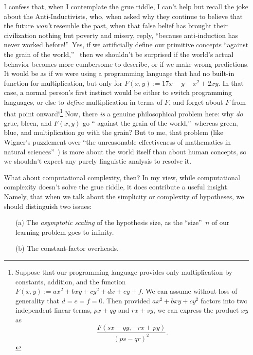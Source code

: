 \documentclass[12pt,onecolumn]{article}%
\begin{document}
I confess that, when I contemplate the grue riddle, I can't help but recall
the joke about the Anti-Inductivists, who, when asked why they continue to
believe that the future \textit{won't} resemble the past, when that false
belief has brought their civilization nothing but poverty and misery, reply,
\textquotedblleft because anti-induction has never worked
before!\textquotedblright\  Yes, if we artificially define our primitive
concepts \textquotedblleft against the grain of the world,\textquotedblright\ %
 then we shouldn't be surprised if the world's actual behavior becomes more
cumbersome to describe, or if we make wrong predictions. It would be as if
we were using a programming language that had no built-in function for
multiplication, but only for $F\left(  x,y\right)  :=17x-y-x^{2}+2xy$. In
that case, a normal person's first instinct would be either to switch
programming languages, or else to \textit{define} multiplication in terms of
$F$, and forget about $F$ from that point onward!\footnote{Suppose that our
programming language provides only multiplication by constants, addition, and
the function $F\left(  x,y\right)  :=ax^{2}+bxy+cy^{2}+dx+ey+f$. We can
assume without loss of generality that $d=e=f=0$. Then provided
$ax^{2}+bxy+cy^{2}$ factors into two independent linear terms, $px+qy$ and
$rx+sy$, we can express the product $xy$ as%
\[
\frac{F\left(  sx-qy,-rx+py\right)  }{\left(  ps-qr\right)  ^{2}}.
\]
} Now, there \textit{is} a genuine philosophical problem here: why
\textit{do} grue, bleen, and $F\left(  x,y\right)  $ go \textquotedblleft
against the grain of the world,\textquotedblright\  whereas green, blue, and
multiplication go with the grain? But to me, that problem (like Wigner's
puzzlement over \textquotedblleft the unreasonable effectiveness of
mathematics in natural sciences\textquotedblright\  \cite{wigner}) is more
about the world itself than about human concepts, so we shouldn't expect any
purely linguistic analysis to resolve it.

What about computational complexity, then? In my view, while computational
complexity doesn't solve the grue riddle, it does contribute a useful insight.
 Namely, that when we talk about the simplicity or complexity of hypotheses,
we should distinguish two issues:

\begin{enumerate}
\item[(a)] The \textit{asymptotic scaling} of the hypothesis size, as the
\textquotedblleft size\textquotedblright\  $n$ of our learning problem goes to infinity.

\item[(b)] The constant-factor overheads.
\end{enumerate}
\end{document}
